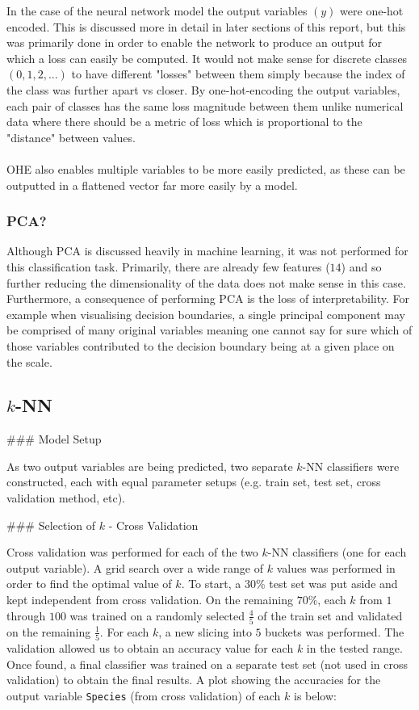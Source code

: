 \documentclass{article}
\begin{document}
In the case of the neural network model the output variables $(y)$ were one-hot encoded. This is discussed more in detail in later sections of this report, but this was primarily done in order to enable the network to produce an output for which a loss can easily be computed. It would not make sense for discrete classes $(0, 1, 2, ...)$ to have different "losses" between them simply because the index of the class was further apart vs closer. By one-hot-encoding the output variables, each pair of classes has the same loss magnitude between them unlike numerical data where there should be a metric of loss which is proportional to the "distance" between values. \\
\\
OHE also enables multiple variables to be more easily predicted, as these can be outputted in a flattened vector far more easily by a model.

\subsubsection{PCA?}

Although PCA is discussed heavily in machine learning, it was not performed for this classification task. Primarily, there are already few features ($14$) and so further reducing the dimensionality of the data does not make sense in this case. Furthermore, a consequence of performing PCA is the loss of interpretability. For example when visualising decision boundaries, a single principal component may be comprised of many original variables meaning one cannot say for sure which of those variables contributed to the decision boundary being at a given place on the scale.


\subsection{$k$-NN}

### Model Setup

As two output variables are being predicted, two separate $k$-NN classifiers were constructed, each with equal parameter setups (e.g. train set, test set, cross validation method, etc).

### Selection of $k$ - Cross Validation

Cross validation was performed for each of the two $k$-NN classifiers (one for each output variable). A grid search over a wide range of $k$ values was performed in order to find the optimal value of $k$. To start, a $30\%$ test set was put aside and kept independent from cross validation. On the remaining $70\%$, each $k$ from $1$ through $100$ was trained on a randomly selected $\frac{4}{5}$ of the train set and validated on the remaining $\frac{1}{5}$. For each $k$, a new slicing into $5$ buckets was performed. The validation allowed us to obtain an accuracy value for each $k$ in the tested range. Once found, a final classifier was trained on a separate test set (not used in cross validation) to obtain the final results. A plot showing the accuracies for the output variable \texttt{Species} (from cross validation) of each $k$ is below:
\end{document}
